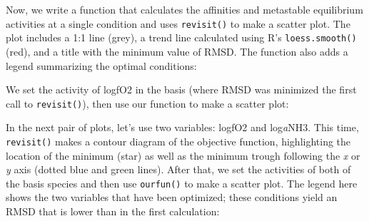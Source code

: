 \documentclass[]{tufte-handout}
\newenvironment{Shaded}{}{}
\newcommand{\KeywordTok}[1]{\textcolor[rgb]{0.00,0.44,0.13}{\textbf{#1}}}
\newcommand{\DataTypeTok}[1]{\textcolor[rgb]{0.56,0.13,0.00}{#1}}
\newcommand{\DecValTok}[1]{\textcolor[rgb]{0.25,0.63,0.44}{#1}}
\newcommand{\FloatTok}[1]{\textcolor[rgb]{0.25,0.63,0.44}{#1}}
\newcommand{\StringTok}[1]{\textcolor[rgb]{0.25,0.44,0.63}{#1}}
\newcommand{\ControlFlowTok}[1]{\textcolor[rgb]{0.00,0.44,0.13}{\textbf{#1}}}
\newcommand{\OperatorTok}[1]{\textcolor[rgb]{0.40,0.40,0.40}{#1}}
\newcommand{\NormalTok}[1]{#1}
\begin{document}
Now, we write a function that calculates the affinities and metastable
equilibrium activities at a single condition and uses
{\texttt{revisit()}} to make a scatter plot. The plot includes a 1:1
line (grey), a trend line calculated using R's \texttt{loess.smooth()}
(red), and a title with the minimum value of RMSD. The function also
adds a legend summarizing the optimal conditions:

\begin{Shaded}
\end{Shaded}

We set the activity of logfO2 in the basis (where RMSD was minimized the
first call to {\texttt{revisit()}}), then use our function to make a
scatter plot:

\begin{Shaded}
\end{Shaded}

In the next pair of plots, let's use two variables: logfO2 and
log\emph{a}NH3. This time, {\texttt{revisit()}} makes a contour diagram
of the objective function, highlighting the location of the minimum
(star) as well as the minimum trough following the \emph{x} or \emph{y}
axis (dotted blue and green lines). After that, we set the activities of
both of the basis species and then use \texttt{ourfun()} to make a
scatter plot. The legend here shows the two variables that have been
optimized; these conditions yield an RMSD that is lower than in the
first calculation:
\end{document}

